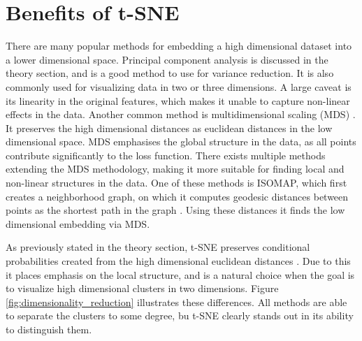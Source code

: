 \documentclass[a4paper]{memoir}
\theoremstyle{plain}
\theoremstyle{definition}
\theoremstyle{remark}
\begin{document}
\section{Benefits of t-SNE}
There are many popular methods for embedding a high dimensional dataset into a lower dimensional space.
Principal component analysis is discussed in the theory section, and is a good method to use for variance reduction.
It is also commonly used for visualizing data in two or three dimensions.
A large caveat is its linearity in the original features, which makes it unable to capture non-linear effects in the data.
Another common method is multidimensional scaling (MDS) \cite{hastie}.
It preserves the high dimensional distances as euclidean distances in the low dimensional space.
MDS emphasises the global structure in the data, as all points contribute significantly to the loss function.
There exists multiple methods extending the MDS methodology, making it more suitable for finding local and non-linear structures in the data. 
One of these methods is ISOMAP, which first creates a neighborhood graph, on which it computes geodesic distances between points as the shortest path in the graph \cite{tenenbaum}.
Using these distances it finds the low dimensional embedding via MDS.

As previously stated in the theory section, t-SNE preserves conditional probabilities created from the high dimensional euclidean distances \cite{hinton}.
Due to this it places emphasis on the local structure, and is a natural choice when the goal is to visualize high dimensional clusters in two dimensions.
Figure \ref{fig:dimensionality_reduction} illustrates these differences.
All methods are able to separate the clusters to some degree, bu t-SNE clearly stands out in its ability to distinguish them.
\end{document}
